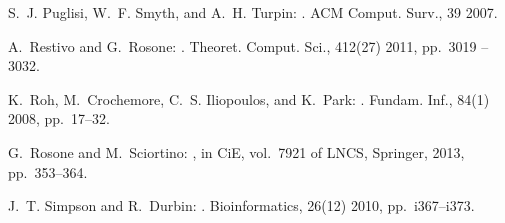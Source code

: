 \documentclass[envcountsame,runningheads]{llncs}
\begin{document}
\begin{thebibliography}{10}
{\sc S.~J. Puglisi, W.~F. Smyth, and A.~H. Turpin}:
.
\newblock ACM Comput. Surv., 39 2007.

{\sc A.~Restivo and G.~Rosone}:
.
\newblock Theoret. Comput. Sci., 412(27) 2011, pp.~3019 -- 3032.

{\sc K.~Roh, M.~Crochemore, C.~S. Iliopoulos, and K.~Park}:
.
\newblock Fundam. Inf., 84(1) 2008, pp.~17--32.

{\sc G.~Rosone and M.~Sciortino}:
, in CiE, vol.~7921 of LNCS, Springer, 2013,
  pp.~353--364.

{\sc J.~T. Simpson and R.~Durbin}:
.
\newblock Bioinformatics, 26(12) 2010, pp.~i367--i373.

\end{thebibliography}
\end{document}
